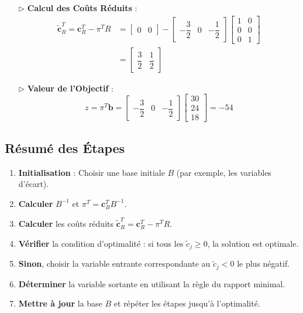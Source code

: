\documentclass{report}
\begin{document}
\begin{multicols*}{2}
\begin{itemize}
    
    \item[$\rhd$] \textbf{Calcul des Coûts Réduits} :
        \begin{align*}
            \tilde{\mathbf{c}}_R^T = \mathbf{c}_R^T - \pi^T R &= 
    \begin{bmatrix}
    0 & 0
    \end{bmatrix} - 
    \begin{bmatrix}
    -\dfrac{3}{2} & 0 & -\dfrac{1}{2}
    \end{bmatrix}
    \begin{bmatrix}
    1 & 0 \\
    0 & 0 \\
    0 & 1
    \end{bmatrix} 
    \\
                                                              &= 
    \begin{bmatrix}
    \dfrac{3}{2} & \dfrac{1}{2}
    \end{bmatrix} 
        \end{align*}
    \item[$\rhd$] \textbf{Valeur de l'Objectif} :
    \[
    z = \pi^T \mathbf{b} = 
    \begin{bmatrix}
    -\dfrac{3}{2} & 0 & -\dfrac{1}{2}
    \end{bmatrix}
    \begin{bmatrix}
    30 \\ 24 \\ 18
    \end{bmatrix} = -54
    \]
\end{itemize}

\subsection{Résumé des Étapes}

\begin{enumerate}
    \item \textbf{Initialisation} : Choisir une base initiale \( B \) (par exemple, les variables d'écart).
    \item \textbf{Calculer} \( B^{-1} \) et \( \pi^T = \mathbf{c}_B^T B^{-1} \).
    \item \textbf{Calculer} les coûts réduits \( \tilde{\mathbf{c}}_R^T = \mathbf{c}_R^T - \pi^T R \).
    \item \textbf{Vérifier} la condition d'optimalité : si tous les \( \tilde{c}_j \geq 0 \), la solution est optimale.
    \item \textbf{Sinon}, choisir la variable entrante correspondante au \( \tilde{c}_j < 0 \) le plus négatif.
    \item \textbf{Déterminer} la variable sortante en utilisant la règle du rapport minimal.
    \item \textbf{Mettre à jour} la base \( B \) et répéter les étapes jusqu'à l'optimalité.
\end{enumerate}

\end{multicols*}
\end{document}
